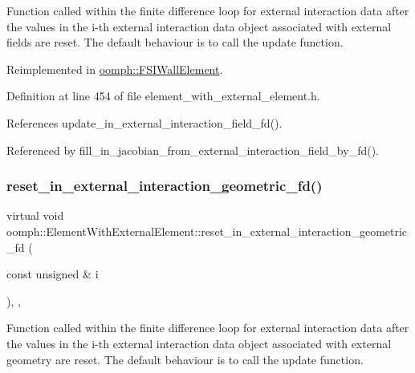 Function called within the finite difference loop for external interaction data after the values in the i-\/th external interaction data object associated with external fields are reset. The default behaviour is to call the update function. 



Reimplemented in \hyperlink{classoomph_1_1FSIWallElement_adc6d07122f1624e2b66ce1a12b530e27}{oomph\+::\+F\+S\+I\+Wall\+Element}.



Definition at line 454 of file element\+\_\+with\+\_\+external\+\_\+element.\+h.



References update\+\_\+in\+\_\+external\+\_\+interaction\+\_\+field\+\_\+fd().



Referenced by fill\+\_\+in\+\_\+jacobian\+\_\+from\+\_\+external\+\_\+interaction\+\_\+field\+\_\+by\+\_\+fd().

\mbox{\label{classoomph_1_1ElementWithExternalElement_a2bc7a069b01795d9c8036fb81e8b319d}} 
\subsubsection{\texorpdfstring{reset\+\_\+in\+\_\+external\+\_\+interaction\+\_\+geometric\+\_\+fd()}{reset\_in\_external\_interaction\_geometric\_fd()}}
{\footnotesize\ttfamily virtual void oomph\+::\+Element\+With\+External\+Element\+::reset\+\_\+in\+\_\+external\+\_\+interaction\+\_\+geometric\+\_\+fd (\begin{DoxyParamCaption}\item[{const unsigned \&}]{i }\end{DoxyParamCaption})\hspace{0.3cm}{\ttfamily [inline]}, {\ttfamily [protected]}, {\ttfamily [virtual]}}



Function called within the finite difference loop for external interaction data after the values in the i-\/th external interaction data object associated with external geometry are reset. The default behaviour is to call the update function. 



